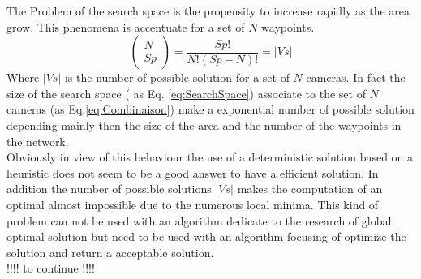 The Problem of the search space is the propensity to increase rapidly as the area grow. This phenomena is accentuate for a set of $N$  waypoints.
 \begin{equation} \label{eq:Combinaison}
 \begin{pmatrix} N \\ Sp \end{pmatrix}  = \frac{Sp!}{N!(Sp-N)!} = |Vs|
 \end{equation} 
 Where $|Vs|$ is the number of possible solution for a set of $N$ cameras. %
 In fact the size of the search space ( as Eq. \ref{eq:SearchSpace}) associate to the set of $N$ cameras (as Eq.\ref{eq:Combinaison}) make a exponential number of possible solution depending mainly then the size of the area and the number of the waypoints in the network. \\
 Obviously in view of this behaviour the use of a deterministic solution based on a heuristic does not seem to be a good answer to have a efficient solution. In addition the number of possible solutions $|Vs|$ makes the computation of an optimal almost impossible due to the numerous local minima. This kind of problem can not be used with an algorithm dedicate to the research of global optimal solution but need to be used with an algorithm focusing of optimize the solution and return a acceptable solution.\\
 !!!! to continue !!!!





 
